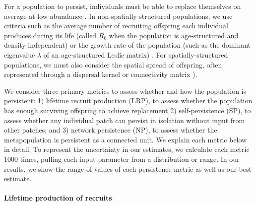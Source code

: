 \documentclass[12pt, oneside]{article}   	%
\begin{document}
For a population to persist, individuals must be able to replace themselves on average at low abundance \citep[e.g.][]{hastings_persistence_2006,botsford_connectivity_2009}. In non-spatially structured populations, we use criteria such as the average number of recruiting offspring each individual produces during its life (called $R_0$ when the population is age-structured and density-independent) or the growth rate of the population (such as the dominant eigenvalue $\lambda$ of an age-structured Leslie matrix) \citep{caswell_matrix_2001, burgess2014beyond}. For spatially-structured populations, we must also consider the spatial spread of offspring, often represented through a dispersal kernel or connectivity matrix \citep[e.g.][]{cowen_scaling_2006, buston2011probability, hogan_local_2011, daloia2015patterns}). %

We consider three primary metrics to assess whether and how the population is persistent: 1) lifetime recruit production (LRP), to assess whether the population has enough surviving offspring to achieve replacement 2) self-persistence (SP), to assess whether any individual patch can persist in isolation without input from other patches, and 3) network persistence (NP), to assess whether the metapopulation is persistent as a connected unit. We explain each metric below in detail. To represent the uncertainty in our estimates, we calculate each metric 1000 times, pulling each input parameter from a distribution or range. In our results, we show the range of values of each persistence metric as well as our best estimate. %

\paragraph*{Lifetime production of recruits}
\end{document}
